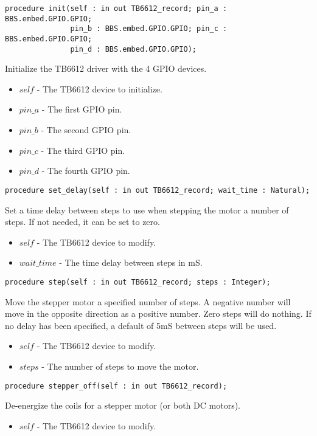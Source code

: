 \documentclass[10pt, openany]{book}
\begin{document}
\begin{lstlisting}
procedure init(self : in out TB6612_record; pin_a : BBS.embed.GPIO.GPIO;
               pin_b : BBS.embed.GPIO.GPIO; pin_c : BBS.embed.GPIO.GPIO;
               pin_d : BBS.embed.GPIO.GPIO);
\end{lstlisting}
Initialize the TB6612 driver with the 4 GPIO devices.
\begin{itemize}
  \item $self$ - The TB6612 device to initialize.
  \item $pin\_a$ - The first GPIO pin.
  \item $pin\_b$ - The second GPIO pin.
  \item $pin\_c$ - The third GPIO pin.
  \item $pin\_d$ - The fourth GPIO pin.
\end{itemize}
\begin{lstlisting}
procedure set_delay(self : in out TB6612_record; wait_time : Natural);
\end{lstlisting}
Set a time delay between steps to use when stepping the motor a number of steps.  If not needed, it can be set to zero.
\begin{itemize}
  \item $self$ - The TB6612 device to modify.
  \item $wait\_time$ - The time delay between steps in mS.
\end{itemize}
\begin{lstlisting}
procedure step(self : in out TB6612_record; steps : Integer);
\end{lstlisting}
Move the stepper motor a specified number of steps.  A negative number will move in the opposite direction as a positive number.  Zero steps will do nothing.  If no delay has been specified, a default of 5mS between steps will be used.
\begin{itemize}
  \item $self$ - The TB6612 device to modify.
  \item $steps$ - The number of steps to move the motor.
\end{itemize}
\begin{lstlisting}
procedure stepper_off(self : in out TB6612_record);
\end{lstlisting}
De-energize the coils for a stepper motor (or both DC motors).
\begin{itemize}
  \item $self$ - The TB6612 device to modify.
\end{itemize}
\end{document}
